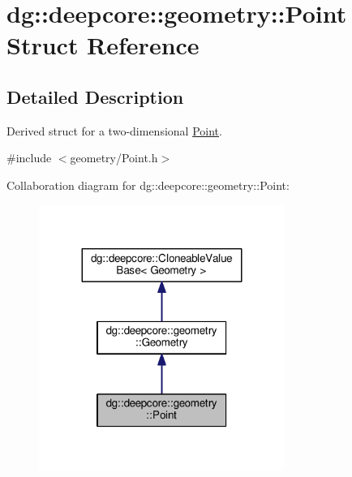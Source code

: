 \hypertarget{structdg_1_1deepcore_1_1geometry_1_1_point}{}\section{dg\+:\+:deepcore\+:\+:geometry\+:\+:Point Struct Reference}
\label{structdg_1_1deepcore_1_1geometry_1_1_point}


\subsection{Detailed Description}
Derived struct for a two-\/dimensional \hyperlink{structdg_1_1deepcore_1_1geometry_1_1_point}{Point}. 

{\ttfamily \#include $<$geometry/\+Point.\+h$>$}



Collaboration diagram for dg\+:\+:deepcore\+:\+:geometry\+:\+:Point\+:
\nopagebreak
\begin{figure}[H]
\begin{center}
\leavevmode
\includegraphics[width=227pt]{structdg_1_1deepcore_1_1geometry_1_1_point__coll__graph}
\end{center}
\end{figure}
